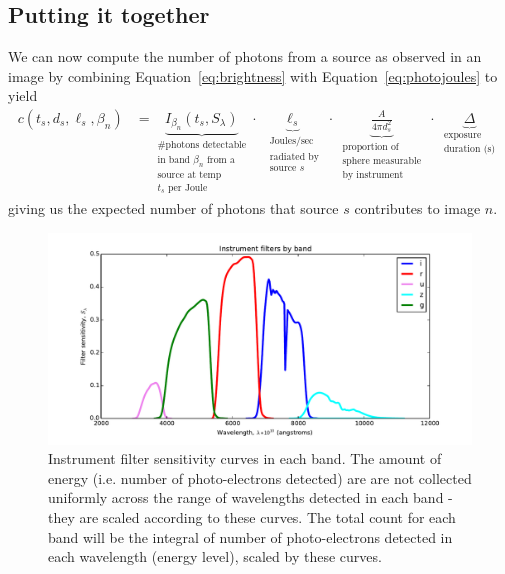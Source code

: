 \documentclass[11pt]{article}
\begin{document}
\subsection{Putting it together}
We can now compute the number of photons from a source as observed in an image by combining Equation~\ref{eq:brightness} with Equation~\ref{eq:photojoules} to yield
\begin{align}
  c(t_s, d_s, \ell_s, \beta_n) &= 
    \underbrace{I_{\beta_n}(t_s, S_\lambda)}_{
      \substack{ \text{\# photons detectable} \\
                 \text{in band $\beta_n$ from a } \\
                 \text{source at temp} \\
                 \text{$t_s$ per Joule}}} \cdot 
    \underbrace{ \ell_s }_{
      \substack{ \text{ Joules/sec } \\
                 \text{ radiated by} \\
                 \text{ source $s$ } }} \cdot
    \underbrace{ \frac{A}{4\pi d_s^2} }_{
      \substack{ \text{ proportion of } \\
                 \text{ sphere measurable } \\
                 \text{ by instrument }}} \cdot
    \underbrace{ \Delta }_{
      \substack{ \text{ exposure } \\
                 \text{ duration (s) } } }
\end{align}
giving us the expected number of photons that source $s$ contributes to image $n$.  

\begin{figure}[t!]
\includegraphics[width=\textwidth]{imgs/filter_sensitivity.pdf}
\caption{Instrument filter sensitivity curves in each band.  The amount of energy (i.e. number of photo-electrons detected) are are not collected uniformly across the range of wavelengths detected in each band - they are scaled according to these curves.  The total count for each band will be the integral of number of photo-electrons detected in each wavelength (energy level), scaled by these curves. }
\label{fig:sensitivity}
\end{figure}
\end{document}
